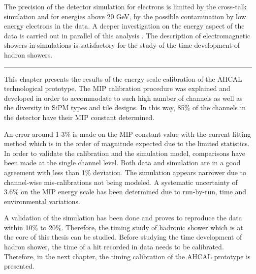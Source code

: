 The precision of the detector simulation for electrons is limited by the cross-talk simulation and for energies above 20 GeV, by the possible contamination by low energy electrons in the data. A deeper investigation on the energy aspect of the data is carried out in parallel of this analysis \cite{AmbraEnergy}. The description of electromagnetic showers in simulations is satisfactory for the study of the time development of hadron showers.

\begin{center}
	\rule{0.5\textwidth}{.4pt}
\end{center}

This chapter presents the results of the energy scale calibration of the AHCAL technological prototype. The MIP calibration procedure was explained and developed in order to accommodate to such high number of channels as well as the diversity in SiPM types and tile designs. In this way, 85\% of the channels in the detector have their MIP constant determined.

An error around 1-3\% is made on the MIP constant value with the current fitting method which is in the order of magnitude expected due to the limited statistics. In order to validate the calibration and the simulation model, comparisons have been made at the single channel level. Both data and simulation are in a good agreement with less than 1\% deviation. The simulation appears narrower due to channel-wise mis-calibrations not being modeled. A systematic uncertainty of 3.6\% on the MIP energy scale has been determined due to run-by-run, time and environmental variations.

A validation of the simulation has been done and proves to reproduce the data within 10\% to 20\%. Therefore, the timing study of hadronic shower which is at the core of this thesis can be studied. Before studying the time development of hadron shower, the time of a hit recorded in data needs to be calibrated. Therefore, in the next chapter, the timing calibration of the AHCAL prototype is presented.
